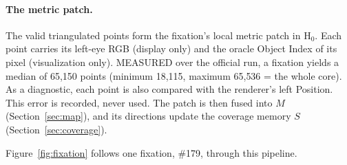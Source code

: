 \documentclass[11pt,a4paper]{article}
\newcommand{\Hz}{\ensuremath{\mathrm{H}_0}}
\begin{document}
\paragraph{The metric patch.} The valid triangulated points form the fixation's local metric patch in \Hz{}. Each point
carries its left-eye RGB (display only) and the oracle Object Index of its pixel (visualization only). MEASURED over
the official run, a fixation yields a median of 65{,}150 points (minimum 18{,}115, maximum 65{,}536 = the whole core).
As a diagnostic, each point is also compared with the renderer's left Position. This error is recorded, never used.
The patch is then fused into $M$ (Section~\ref{sec:map}), and its directions update the coverage memory $S$
(Section~\ref{sec:coverage}).

Figure~\ref{fig:fixation} follows one fixation, \#179, through this pipeline.
\end{document}
